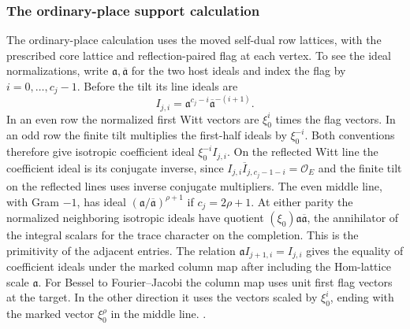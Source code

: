 \subsubsection{The ordinary-place support calculation}
The ordinary-place calculation uses the moved self-dual row
lattices, with the prescribed core lattice and reflection-paired
flag at each vertex. To see the ideal normalizations, write
\(\mathfrak a,\overline{\mathfrak a}\) for the two host ideals
and index the flag by \(i=0,\ldots,c_j-1\).
Before the tilt its line ideals are
\[
 I_{j,i}=\mathfrak a^{c_j-i}\overline{\mathfrak a}^{-(i+1)}.
\]
In an even row the normalized first Witt vectors are
\(\xi_0^i\) times the flag vectors. In an odd row the finite
tilt multiplies the first-half ideals by \(\xi_0^{-i}\).
Both conventions therefore give isotropic coefficient ideal
\(\xi_0^{-i}I_{j,i}\). On the reflected Witt line the
coefficient ideal is its conjugate inverse, since
\(I_{j,i}\overline I_{j,c_j-1-i}=\mathcal O_E\) and the
finite tilt on the reflected lines uses inverse conjugate
multipliers. The even middle line, with Gram \(-1\), has
ideal \((\mathfrak a/\overline{\mathfrak a})^{\rho+1}\)
if \(c_j=2\rho+1\). At either parity the normalized neighboring
isotropic ideals have quotient
\((\xi_0)\mathfrak a\overline{\mathfrak a}\),
the annihilator of the integral scalars for the trace
character on the completion. This is the primitivity of
the adjacent entries. The relation
\(\mathfrak a I_{j+1,i}=I_{j,i}\) gives the equality of
coefficient ideals under the marked column map after including
the Hom-lattice scale \(\mathfrak a\).
For Bessel to Fourier--Jacobi the column map uses unit
first flag vectors at the target. In the other direction
it uses the vectors scaled by \(\xi_0^i\), ending with the
marked vector \(\xi_0^\rho\) in the middle line.
.


